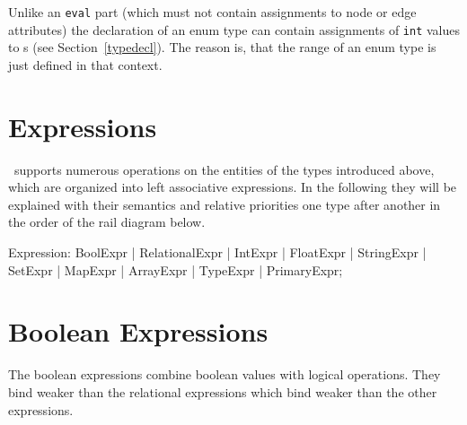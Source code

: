 \begin{note}
	Unlike an {\tt eval} part (which must not contain assignments to node or edge attributes) the declaration of an enum type can contain assignments of {\tt int} values to s (see Section~\ref{typedecl}).
	The reason is, that the range of an enum type is just defined in that context.
\end{note}


\section{Expressions}\label{sub:expr}

\GrG~supports numerous operations on the entities of the types introduced above, which are organized into left associative expressions.
In the following they will be explained with their semantics and relative priorities one type after another in the order of the rail diagram below.

\begin{rail}
  Expression: BoolExpr | RelationalExpr | IntExpr | FloatExpr | StringExpr | SetExpr | MapExpr | ArrayExpr | TypeExpr | PrimaryExpr;
\end{rail}


\section{Boolean Expressions}

The boolean expressions combine boolean values with logical operations.
They bind weaker than the relational expressions which bind weaker than the other expressions.

